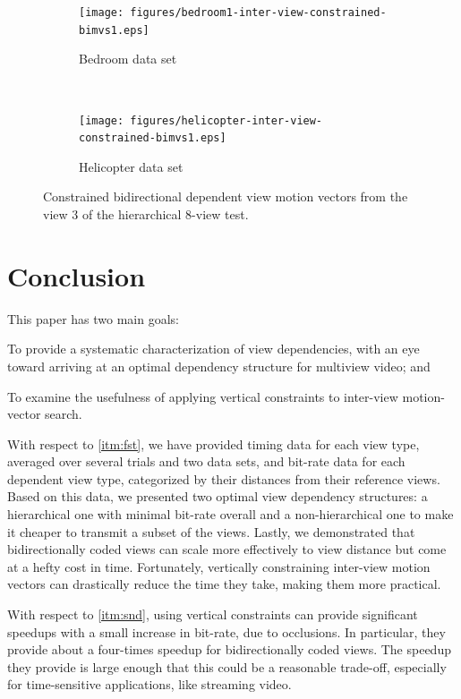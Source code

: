 \documentclass{sig-alternate-05-2015}
\begin{document}
\begin{figure}[H]
\centering
\begin{subfigure}{.5\textwidth}
\centering
\texttt{[image: figures/bedroom1-inter-view-constrained-bimvs1.eps]}
\caption{Bedroom data set}
\label{fig:bedroom-inter-view-constrained-bimvs1}
\end{subfigure} \\
\begin{subfigure}{.5\textwidth}
\centering
\texttt{[image: figures/helicopter-inter-view-constrained-bimvs1.eps]}
\caption{Helicopter data set}
\label{fig:helicopter-inter-view-constrained-bimvs1}
\end{subfigure}
\caption{Constrained bidirectional dependent view motion vectors from the view 3
of the hierarchical 8-view test.}
\label{fig:inter-view-constrained-bimvs1}
\end{figure}
   
\section{Conclusion} %
\label{sec:conclusion} %
This paper has two main goals: \begin{compactenum}
\item \label{itm:fst} To provide a systematic characterization of view
dependencies, with an eye toward arriving at an optimal dependency structure for
multiview video; and
\item \label{itm:snd} To examine the usefulness of applying vertical constraints
to inter-view motion-vector search. \end{compactenum}

With respect to \ref{itm:fst}, we have provided timing data for each view type,
averaged over several trials and two data sets, and bit-rate data for each
dependent view type, categorized by their distances from their reference views.
Based on this data, we presented two optimal view dependency structures: a
hierarchical one with minimal bit-rate overall and a non-hierarchical one to
make it cheaper to transmit a subset of the views. Lastly, we demonstrated that
bidirectionally coded views can scale more effectively to view distance but
come at a hefty cost in time. Fortunately, vertically constraining inter-view
motion vectors can drastically reduce the time they take, making them more
practical.

With respect to \ref{itm:snd}, using vertical constraints can provide
significant speedups with a small increase in bit-rate, due to occlusions. 
In particular, they provide about a four-times speedup for bidirectionally
coded views. The speedup they provide is large enough that this could be a
reasonable trade-off, especially for time-sensitive applications, like streaming
video.

\balance


\end{document}
